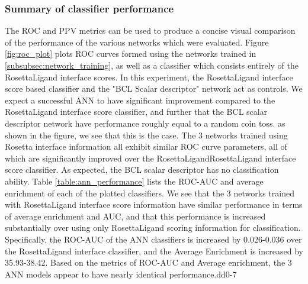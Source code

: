 \subsubsection{Summary of classifier performance}
\label{subsubsec:classifier_performance}
The ROC and PPV metrics can be used to produce a concise visual comparison of the performance of the various networks which were evaluated.
Figure \ref{fig:roc_plot} plots ROC curves formed using the networks trained in \ref{subsubsec:network_training}, as well as a classifier which consists entirely of the RosettaLigand interface scores. 
In this experiment, the RosettaLigand interface score based classifier and the "BCL Scalar descriptor" network act as controls.
We expect a successful ANN to have significant improvement compared to the RosettaLigand interface score classifier, and further that the BCL scalar descriptor network have performance roughly equal to a random coin toss.
as shown in the figure, we see that this is the case.  The 3 networks trained using Rosetta interface information all exhibit similar ROC curve parameters, all of which are significantly improved over the RosettaLigandRosettaLigand interface score classifier.
As expected, the BCL scalar descriptor has no classification ability.
Table \ref{table:ann_performance} lists the ROC-AUC and average enrichment of each of the plotted classifiers.
We see that the 3 networks trained with RosettaLigand interface score information have similar performance in terms of average enrichment and AUC, and that this performance is increased substantially over using only RosettaLigand scoring information for classification.
Specifically, the ROC-AUC of the ANN classifiers is increased by 0.026-0.036 over the RosettaLigand interface classifier, and the Average Enrichment is increased by 35.93-38.42.
Based on the metrics of ROC-AUC and Average enrichment, the 3 ANN models appear to have nearly identical performance.dd0-7
